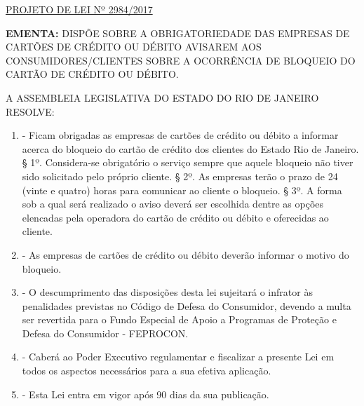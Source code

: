 \documentclass[10pt]{article}
\date{}
\begin{document}
\maketitle
\begin{center}
  \huge
  \vspace{-3cm}\href{http://alerjln1.alerj.rj.gov.br/scpro1519.nsf/f4b46b3cdbba990083256cc900746cf6/d1cb1b5e1deb66f583258145005c710d?OpenDocument}{PROJETO DE LEI Nº 2984/2017}
\bigskip
\bigskip
\bigskip
  
\end{center}

\textbf{EMENTA:} 
DISPÕE SOBRE A OBRIGATORIEDADE DAS EMPRESAS DE CARTÕES DE CRÉDITO OU DÉBITO AVISAREM AOS CONSUMIDORES/CLIENTES SOBRE A OCORRÊNCIA DE BLOQUEIO DO CARTÃO DE CRÉDITO OU DÉBITO.








\bigskip

\noindent
A ASSEMBLEIA LEGISLATIVA DO ESTADO DO RIO DE JANEIRO RESOLVE:

\begin{enumerate}[label=Art. \arabic*\textdegree]

\item - Ficam obrigadas as empresas de cartões de crédito ou débito a informar acerca do bloqueio do cartão de crédito dos clientes do Estado Rio de Janeiro. 
§ 1º. Considera-se obrigatório o serviço sempre que aquele bloqueio não tiver sido solicitado pelo próprio cliente. 
§ 2º. As empresas terão o prazo de 24 (vinte e quatro) horas para comunicar ao cliente o bloqueio. 
§ 3º. A forma sob a qual será realizado o aviso deverá ser escolhida dentre as opções elencadas pela operadora do cartão de crédito ou débito e oferecidas ao cliente.

\item - As empresas de cartões de crédito ou débito deverão informar o motivo do bloqueio.
 
\item - O descumprimento das disposições desta lei sujeitará o infrator às penalidades previstas no Código de Defesa do Consumidor, devendo a multa ser revertida para o Fundo Especial de Apoio a Programas de Proteção e Defesa do Consumidor - FEPROCON.
  
\item - Caberá ao Poder Executivo regulamentar e fiscalizar a presente Lei em todos os aspectos necessários para a sua efetiva aplicação.
 
\item - Esta Lei entra em vigor após 90 dias da sua publicação.

\end{enumerate}
\end{document}
